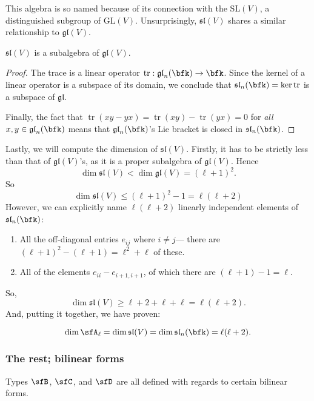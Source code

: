 \documentclass{article}
\DeclareMathOperator{\tr}{tr}
\newcommand*\GL{\ensuremath{\text{GL}}}
\newcommand*\SL{\ensuremath{\text{SL}}}
\newcommand*\glalg{\ensuremath{\mathfrak{gl}}}
\newcommand*\slalg{\ensuremath{\mathfrak{sl}}}
\begin{document}
This algebra is so named because of its connection with the  $\SL(V)$, a distinguished subgroup of $\GL(V)$.
Unsurprisingly, $\slalg(V)$ shares a similar relationship to $\glalg(V)$.

\begin{proposition}
    $\slalg(V)$ is a subalgebra of $\glalg(V)$.
\end{proposition}
\begin{proof}
    The trace is a linear operator $\tr: \glalg_n(\bfk) \to \bfk$.
    Since the kernel of a linear operator is a subspace of its domain, we conclude that $\slalg_n(\bfk) = \ker \tr$ is a subspace of $\glalg$.

    Finally, the fact that $\tr(xy - yx) = \tr(xy) - \tr(yx) = 0$ for \textit{all} $x,y \in \glalg_n(\bfk)$ means that $\glalg_n(\bfk)$'s Lie bracket is closed in $\slalg_n(\bfk)$.
\end{proof}

Lastly, we will compute the dimension of $\slalg(V)$.
Firstly, it has to be strictly less than that of $\glalg(V)$'s, as it is a proper subalgebra of $\glalg(V)$.
Hence
\[
    \dim \slalg(V) < \dim \glalg(V) = (\ell+1)^2.
\]
So
\[
    \dim \slalg(V) \leq (\ell+1)^2 - 1 = \ell(\ell+2)
\]
However, we can explicitly name $\ell(\ell+2)$ linearly independent elements of $\slalg_n(\bfk)$:
\begin{enumerate}
    \item 
        All the off-diagonal entries $e_{ij}$ where $i \neq j$--- there are $(\ell+1)^2 - (\ell + 1) = \ell^2 + \ell$ of these.
    \item 
        All of the elements $e_{ii} - e_{i+1,i+1}$, of which there are $(\ell + 1) -1 = \ell$. 
\end{enumerate}
So,
\[
    \dim \slalg(V) \geq \ell+2 + \ell + \ell = \ell(\ell + 2).
\]
And, putting it together, we have proven:
\begin{proposition}
    \[
        \dim \sfA_\ell
        =
        \dim \slalg(V)
        =
        \dim \slalg_n(\bfk)
        =
        \ell(\ell+2).
    \]
\end{proposition}

\subsubsection{The rest; bilinear forms}

Types $\sfB$, $\sfC$, and $\sfD$ are all defined with regards to certain bilinear forms.
\end{document}
